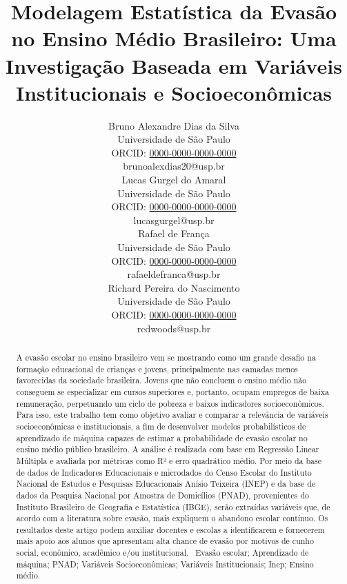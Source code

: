 \documentclass[english, spanish, brazilian]{RBIEarticle} %
\title{Modelagem Estatística da Evasão no Ensino Médio Brasileiro: Uma Investigação Baseada em Variáveis Institucionais e Socioeconômicas}
\author{%
	\parbox{3.8cm}{%
		Bruno Alexandre Dias da Silva\\
		Universidade de São Paulo\\
		ORCID: \href{https://orcid.org/0000-0000-0000-0000}{0000-0000-0000-0000}\\
		brunoalexdias20@usp.br
	}
        \hspace{0.3cm}
	\parbox{3.8cm}{%
		Lucas Gurgel do Amaral\\
		Universidade de São Paulo\\
		ORCID: \href{https://orcid.org/0000-0000-0000-0000}{0000-0000-0000-0000}\\
		lucasgurgel@usp.br
	}
        \hspace{0.3cm}
        \parbox{3.8cm}{%
		Rafael de França\\
		Universidade de São Paulo\\
		ORCID: \href{https://orcid.org/0000-0000-0000-0000}{0000-0000-0000-0000}\\
		rafaeldefranca@usp.br
	}
        \hspace{0.3cm}
	\parbox{3.9cm}{\raggedright%
		Richard Pereira do Nascimento\\
		Universidade de São Paulo\\
		ORCID: \href{https://orcid.org/0000-0000-0000-0000}{0000-0000-0000-0000}\\
		rcdwoods@usp.br
	}
}
\begin{document}
\maketitle

\begin{otherlanguage}{brazilian}
\begin{abstract}
A evasão escolar no ensino brasileiro vem se mostrando como um grande desafio na formação educacional de crianças e jovens, principalmente nas camadas menos favorecidas da sociedade brasileira. Jovens que não concluem o ensino médio não conseguem se especializar em cursos superiores e, portanto, ocupam empregos de baixa remuneração, perpetuando um ciclo de pobreza e baixos indicadores socioeconômicos. Para isso, este trabalho tem como objetivo avaliar e comparar a relevância de variáveis socioeconômicas e institucionais, a fim de desenvolver modelos probabilísticos de aprendizado de máquina capazes de estimar a probabilidade de evasão escolar no ensino médio público brasileiro. A análise é realizada com base em Regressão Linear Múltipla e avaliada por métricas como R² e erro quadrático médio. Por meio da base de dados de Indicadores Educacionais e microdados do Censo Escolar do Instituto Nacional de Estudos e Pesquisas Educacionais Anísio Teixeira (INEP) e da base de dados da Pesquisa Nacional por Amostra de Domicílios (PNAD), provenientes do Instituto Brasileiro de Geografia e Estatística (IBGE), serão extraídas variáveis que, de acordo com a literatura sobre evasão, mais expliquem o abandono escolar contínuo. Os resultados deste artigo podem auxiliar docentes e escolas a identificarem e fornecerem mais apoio aos alunos que apresentam alta chance de evasão por motivos de cunho social, econômico, acadêmico e/ou institucional.
\keywords\ Evasão escolar; Aprendizado de máquina; PNAD; Variáveis Socioeconômicas; Variáveis Institucionais; Inep; Ensino médio.
\end{abstract}
\end{otherlanguage}
\end{document}
